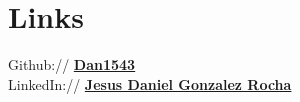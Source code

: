 \documentclass[]{deedy-resume-reversed}
\begin{document}
\begin{minipage}[t]{0.33\textwidth}

\section{Links}
Github:// \href{https://github.com/Dan1543}{\bf Dan1543} \\
LinkedIn://  \href{https://www.linkedin.com/in/jesus-daniel-gonzalez-rocha-93010b28b/}{\bf Jesus Daniel Gonzalez Rocha}
\sectionsep

\end{minipage}
\end{document}

